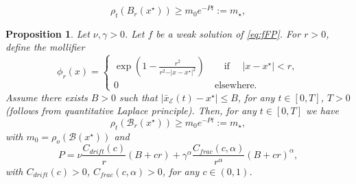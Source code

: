 \documentclass[10pt,a4paper]{amsart}
\newtheorem{proposition}{Proposition}
\begin{document}
	\begin{equation}\label{eq:bound_mass}
		\rho_t(B_r(x^\star)) \geq m_0 e^{-Pt} :=m_\star,
	\end{equation}

\begin{proposition}\label{prop:mass_bounds}
	Let $\nu,\gamma>0$. Let $f$ be a weak solution of \eqref{eq:fFP}. For $r>0$, define the mollifier
	\begin{equation}\label{eq:mollifier}
		\phi_r(x) = \begin{cases}
			\exp \left( 1- \frac{r^2}{r^2 - \vert x-x^\star\vert^2} \right)  \qquad \text{if } \quad \vert x-x^\star \vert < r,\\
			0  \qquad  \qquad \qquad \qquad \qquad  \text{elsewhere}.
		\end{cases}
	\end{equation}
	Assume there exists $B>0$ such that $
	\vert \bar{x}_\mathcal{E}(t) - x^\star \vert \leq B$,
	for any $t \in [0,T]$, $T>0$ (follows from quantitative Laplace principle). Then, for any $t\in[0,T]$ we have 
	\begin{equation}\label{eq:mass_bound}
		\rho_t(\mathcal{B}_r(x^\star)) \geq  m_0 e^{-P t}:= m_\star , 
	\end{equation}
	with $m_0 = \rho_o(\mathcal{B}(x^\star))$ and 
	\begin{equation*}
		P = \nu \frac{C_{drift}(c)}{r} (B+cr) + \gamma^\alpha\frac{C_{frac}(c,\alpha)}{r^\alpha} (B+cr)^\alpha,
	\end{equation*}
	with $C_{drift}(c)>0$, $ C_{frac}(c,\alpha)>0$, for any $c\in (0,1)$.  
\end{proposition}
\end{document}
